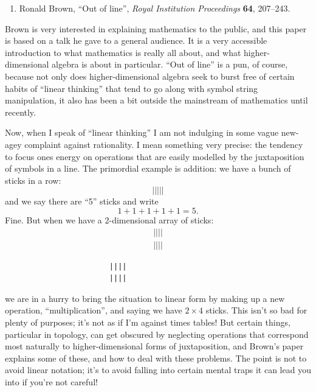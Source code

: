 \documentclass{article}
\def\tightlist{}
\renewcommand{\texttt}[1]{%
  \begingroup
  \ttfamily
  \begingroup\lccode`~=`/\lowercase{\endgroup\def~}{/\discretionary{}{}{}}%
  \begingroup\lccode`~=`[\lowercase{\endgroup\def~}{[\discretionary{}{}{}}%
  \begingroup\lccode`~=`.\lowercase{\endgroup\def~}{.\discretionary{}{}{}}%
  \catcode`/=\active\catcode`[=\active\catcode`.=\active
  \scantokens{#1\noexpand}%
  \endgroup
}
\begin{document}
\begin{enumerate}
\def\labelenumi{\arabic{enumi})}
\tightlist
\item
  Ronald Brown, ``Out of line'', \emph{Royal Institution Proceedings}
  \textbf{64}, 207--243.
\end{enumerate}

Brown is very interested in explaining mathematics to the public, and
this paper is based on a talk he gave to a general audience. It is a
very accessible introduction to what mathematics is really all about,
and what higher-dimensional algebra is about in particular. ``Out of
line'' is a pun, of course, because not only does higher-dimensional
algebra seek to burst free of certain habits of ``linear thinking'' that
tend to go along with symbol string manipulation, it also has been a bit
outside the mainstream of mathematics until recently.

Now, when I speak of ``linear thinking'' I am not indulging in some
vague new-agey complaint against rationality. I mean something very
precise: the tendency to focus ones energy on operations that are easily
modelled by the juxtaposition of symbols in a line. The primordial
example is addition: we have a bunch of sticks in a row:
\[\vert\vert\vert\vert\vert\] and we say there are ``5'' sticks and
write \[1+1+1+1+1=5.\] Fine. But when we have a 2-dimensional array of
sticks:
\[\begin{gathered}\vert\vert\vert\vert\\\vert\vert\vert\vert\end{gathered}\]

\begin{verbatim}
                        ||||
                        ||||
\end{verbatim}

we are in a hurry to bring the situation to linear form by making up a
new operation, ``multiplication'', and saying we have \(2 \times 4\)
sticks. This isn't so bad for plenty of purposes; it's not as if I'm
against times tables! But certain things, particular in topology, can
get obscured by neglecting operations that correspond most naturally to
higher-dimensional forms of juxtaposition, and Brown's paper explains
some of these, and how to deal with these problems. The point is not to
avoid linear notation; it's to avoid falling into certain mental traps
it can lead you into if you're not careful!

\end{document}
